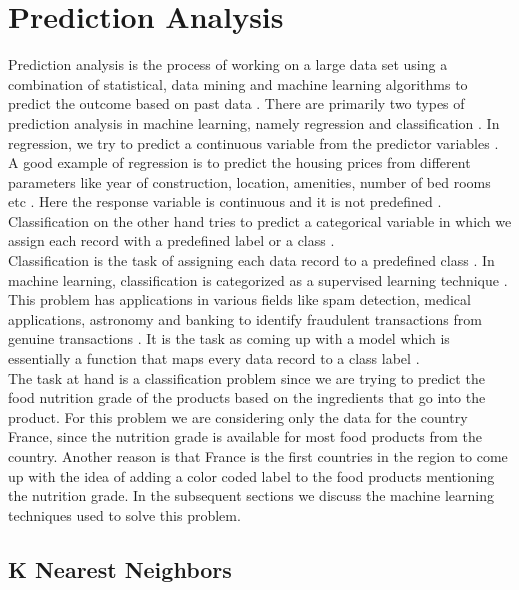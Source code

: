 \documentclass[sigconf]{acmart}
\begin{document}
\section{Prediction Analysis}
Prediction analysis is the process of working on  a large data set using a combination of statistical, data mining and machine learning algorithms to predict the outcome based on past data \cite{book-shai}.
There are primarily two types of prediction analysis in machine learning, namely regression and classification \cite{book-tan}. In regression, we try to predict a continuous variable from the predictor variables \cite{book-tan}. A good example of regression is to predict the housing prices from different parameters like year of construction, location, amenities, number of bed rooms etc \cite{book-tan}. Here the response variable is continuous and it is not predefined \cite{book-tan}. Classification on the other hand tries to predict a categorical variable in which we assign each record with a predefined label or a class \cite{book-tan}. \\

Classification is the task of assigning each data record to a predefined class \cite{book-tan}. In machine learning, classification is categorized as a supervised learning technique \cite{book-tan}. This problem has applications in various fields like spam detection, medical applications, astronomy and banking to identify fraudulent transactions from genuine transactions \cite{book-tan}. It is the task as coming up with a model which is essentially a function that maps every data record to a class label \cite{book-tan}. \\ 

The task at hand is a classification problem since we are trying to predict the food nutrition grade of the products based on the ingredients that go into the product. For this problem we are considering only the data for the country France, since the nutrition grade is available for most food products from the country. Another reason is that France is the first countries in the region to come up with the idea of adding a color coded label to the food products mentioning the nutrition grade. In the subsequent sections we discuss the machine learning techniques used to solve this problem.

\subsection{K Nearest Neighbors}
\end{document}
